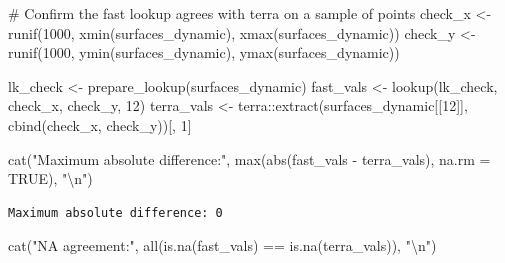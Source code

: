 \documentclass[
  letterpaper,
  DIV=11,
  numbers=noendperiod]{scrartcl}
\newenvironment{Shaded}{\begin{snugshade}}{\end{snugshade}}
\newcommand{\AttributeTok}[1]{\textcolor[rgb]{0.40,0.45,0.13}{#1}}
\newcommand{\CommentTok}[1]{\textcolor[rgb]{0.37,0.37,0.37}{#1}}
\newcommand{\ConstantTok}[1]{\textcolor[rgb]{0.56,0.35,0.01}{#1}}
\newcommand{\DecValTok}[1]{\textcolor[rgb]{0.68,0.00,0.00}{#1}}
\newcommand{\FunctionTok}[1]{\textcolor[rgb]{0.28,0.35,0.67}{#1}}
\newcommand{\NormalTok}[1]{\textcolor[rgb]{0.00,0.23,0.31}{#1}}
\newcommand{\OtherTok}[1]{\textcolor[rgb]{0.00,0.23,0.31}{#1}}
\newcommand{\SpecialCharTok}[1]{\textcolor[rgb]{0.37,0.37,0.37}{#1}}
\newcommand{\StringTok}[1]{\textcolor[rgb]{0.13,0.47,0.30}{#1}}
\begin{document}
\begin{Shaded}
\end{Shaded}

\begin{Shaded}
\begin{Highlighting}[]
\CommentTok{\# Confirm the fast lookup agrees with terra on a sample of points}
\NormalTok{check\_x }\OtherTok{\textless{}{-}} \FunctionTok{runif}\NormalTok{(}\DecValTok{1000}\NormalTok{, }\FunctionTok{xmin}\NormalTok{(surfaces\_dynamic), }\FunctionTok{xmax}\NormalTok{(surfaces\_dynamic))}
\NormalTok{check\_y }\OtherTok{\textless{}{-}} \FunctionTok{runif}\NormalTok{(}\DecValTok{1000}\NormalTok{, }\FunctionTok{ymin}\NormalTok{(surfaces\_dynamic), }\FunctionTok{ymax}\NormalTok{(surfaces\_dynamic))}

\NormalTok{lk\_check   }\OtherTok{\textless{}{-}} \FunctionTok{prepare\_lookup}\NormalTok{(surfaces\_dynamic)}
\NormalTok{fast\_vals  }\OtherTok{\textless{}{-}} \FunctionTok{lookup}\NormalTok{(lk\_check, check\_x, check\_y, }\DecValTok{12}\NormalTok{)}
\NormalTok{terra\_vals }\OtherTok{\textless{}{-}}\NormalTok{ terra}\SpecialCharTok{::}\FunctionTok{extract}\NormalTok{(surfaces\_dynamic[[}\DecValTok{12}\NormalTok{]], }\FunctionTok{cbind}\NormalTok{(check\_x, check\_y))[, }\DecValTok{1}\NormalTok{]}

\FunctionTok{cat}\NormalTok{(}\StringTok{"Maximum absolute difference:"}\NormalTok{,}
    \FunctionTok{max}\NormalTok{(}\FunctionTok{abs}\NormalTok{(fast\_vals }\SpecialCharTok{{-}}\NormalTok{ terra\_vals), }\AttributeTok{na.rm =} \ConstantTok{TRUE}\NormalTok{), }\StringTok{"}\SpecialCharTok{\textbackslash{}n}\StringTok{"}\NormalTok{)}
\end{Highlighting}
\end{Shaded}

\begin{verbatim}
Maximum absolute difference: 0 
\end{verbatim}

\begin{Shaded}
\begin{Highlighting}[]
\FunctionTok{cat}\NormalTok{(}\StringTok{"NA agreement:"}\NormalTok{, }\FunctionTok{all}\NormalTok{(}\FunctionTok{is.na}\NormalTok{(fast\_vals) }\SpecialCharTok{==} \FunctionTok{is.na}\NormalTok{(terra\_vals)), }\StringTok{"}\SpecialCharTok{\textbackslash{}n}\StringTok{"}\NormalTok{)}
\end{Highlighting}
\end{Shaded}
\end{document}
